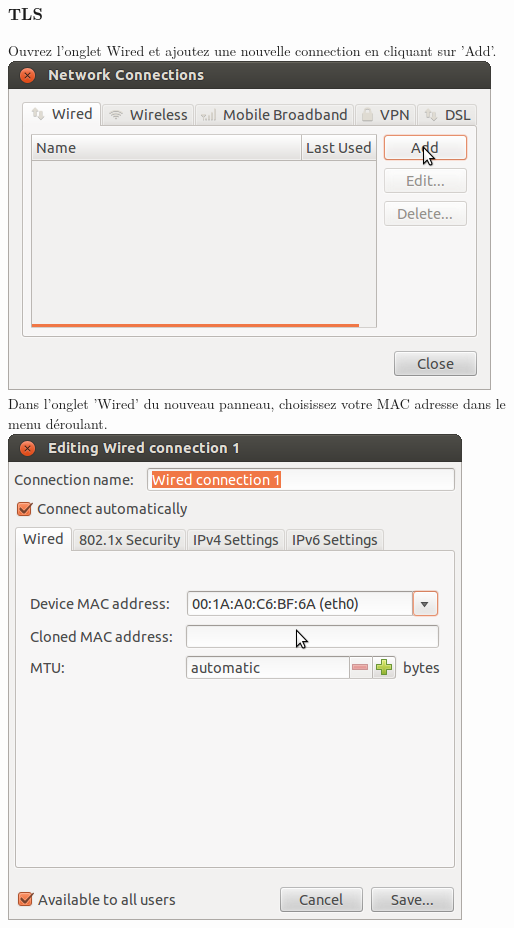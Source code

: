 \subsubsection{TLS}
Ouvrez l'onglet Wired et ajoutez une nouvelle connection en cliquant sur 'Add'.\\
\includegraphics[width=\screenShotSize{}]{imgUser/wiredAdd.png}\\
Dans l'onglet 'Wired' du nouveau panneau, choisissez votre MAC adresse dans le menu déroulant.\\
\includegraphics[width=\screenShotSize{}]{imgUser/setMac.png}\\
